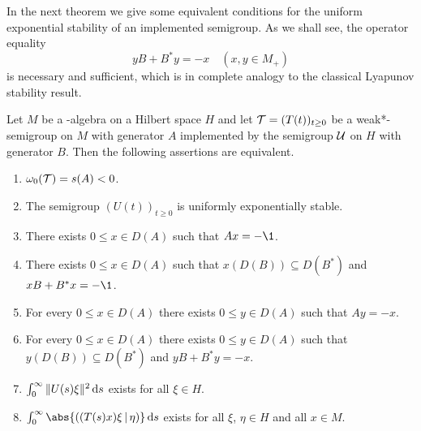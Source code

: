 In the next theorem we give some equivalent conditions for the uniform exponential stability of an implemented semigroup.
As we shall see, the operator equality
\[
yB + B^{*}y = -x \quad (x, y \in M_{+})
\]
is necessary and sufficient, which is in complete analogy to the classical Lyapunov stability result.
\begin{theorem}\label{thm:d4-2.2}
Let $M$ be a \WA-algebra on a Hilbert space $H$ and let $\TT = (T(t))_{t \geq 0}$ be a weak*-semigroup on $M$ with generator $A$ implemented by the semigroup $\mathcal{U}$ on $H$ with generator $B$.
Then the following assertions are equivalent.
\begin{enumerate}[\upshape (a)]

\item\label{item:d4-2.2-a}
$\omega_{0}(\mathcal{T}) = s(A) < 0$.

\item\label{item:d4-2.2-b}
The semigroup $(U(t))_{t \geq 0}$ is uniformly exponentially stable.

\item\label{item:d4-2.2-c}
There exists $0 \leq x \in D(A)$ such that $Ax = -\1$.

\item\label{item:d4-2.2-d}
There exists $0 \leq x \in D(A)$ such that $x(D(B)) \subseteq D(B^{*})$ \mbox{and $xB+B^{*}x = -\1$}.

\item\label{item:d4-2.2-e}
For every $0 \leq x \in D(A)$ there exists $0 \leq y \in D(A)$ such that $Ay = -x$.

\item\label{item:d4-2.2-f}
For every $0 \leq x \in D(A)$ there exists $0 \leq y \in D(A)$ such that $y(D(B)) \subseteq D(B^{*})$ and $yB+B^{*}y = -x$.

\item\label{item:d4-2.2-g}
$\int_{0}^{\infty} \|U(s)\xi\|^2 \mathop{}\!\mathrm{d}{s}$ exists for all $\xi \in H$.

\item\label{item:d4-2.2-h}
$\int_{0}^{\infty} \abs{((T(s)x)\xi \,|\, \eta)} \ds$ exists for all $\xi$, $\eta \in H$ and all $x \in M$.
\end{enumerate}
\end{theorem}
